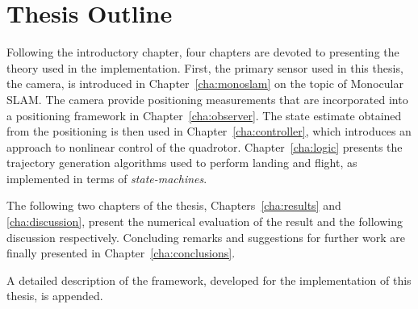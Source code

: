 \section{Thesis Outline}
    Following the introductory chapter, four chapters are devoted to
    presenting the theory used in the implementation.
    First, the primary sensor used in this thesis, the camera, is introduced
    in Chapter~\ref{cha:monoslam} on the topic of Monocular SLAM.
    The camera provide positioning measurements that are incorporated
    into a positioning framework in Chapter~\ref{cha:observer}.
    The state estimate obtained from the positioning is then used in Chapter~\ref{cha:controller},
    which introduces an approach to nonlinear control of the quadrotor.
    Chapter~\ref{cha:logic} presents the trajectory generation algorithms
    used to perform landing and flight, as implemented in terms of \textit{state-machines}.

    The following two chapters of the thesis, Chapters~\ref{cha:results} and \ref{cha:discussion}, present the
    numerical evaluation of the result and the following discussion respectively.
    Concluding remarks and suggestions for further work are finally presented in Chapter~\ref{cha:conclusions}.

    A detailed description of the \crap framework, developed for the
    implementation of this thesis, is appended.
